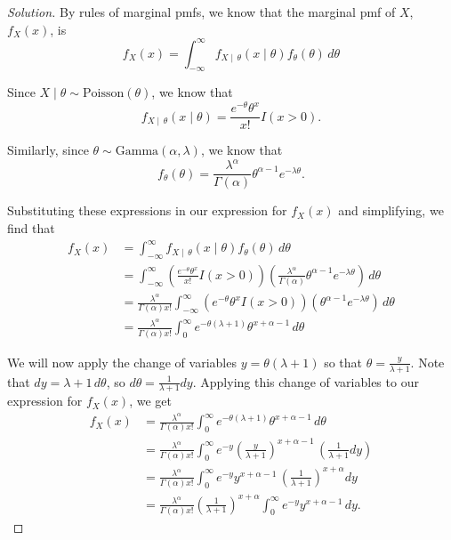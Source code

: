 \documentclass[11pt]{article}
\newenvironment{solution}
  {\renewcommand\qedsymbol{$\blacksquare$}\begin{proof}[Solution]}
  {\end{proof}}
\begin{document}
\begin{enumerate}
    \begin{solution}
    By rules of marginal pmfs, we know that the marginal pmf of $X$, $f_X(x)$, is
    \[
        f_X(x) = \int_{-\infty}^{\infty} f_{X \mid \,\theta}(x \mid \theta) f_\theta (\theta) \, d\theta
    \]

    Since $X \mid \theta \sim \mathrm{Poisson}(\theta)$, we know that 
    \[
        f_{X \mid \,\theta}(x \mid \theta) = \frac{e^{-\theta}\theta^x}{x!}I(x > 0).
    \]

    Similarly, since $\theta \sim \mathrm{Gamma}(\alpha, \lambda)$, we know that
    \[
        f_{\theta}(\theta) = \frac{\lambda^\alpha}{\Gamma(\alpha)}\theta^{\alpha - 1}e^{-\lambda\theta}.
    \]

    Substituting these expressions in our expression for $f_X(x)$ and simplifying, we find that
    \begin{align*}
        f_X(x) &= \int_{-\infty}^{\infty} f_{X \mid \,\theta}(x \mid \theta) f_\theta (\theta) \, d\theta \\
        &= \int_{-\infty}^{\infty} \left(\frac{e^{-\theta}\theta^x}{x!}I(x > 0)\right) \left( \frac{\lambda^\alpha}{\Gamma(\alpha)}\theta^{\alpha - 1}e^{-\lambda\theta} \right) \, d\theta \\
        &= \frac{\lambda^\alpha}{\Gamma(\alpha) x!} \int_{-\infty}^{\infty} \left(e^{-\theta}\theta^xI(x > 0)\right) \left( \theta^{\alpha - 1}e^{-\lambda\theta} \right) \, d\theta \\
        &= \frac{\lambda^\alpha}{\Gamma(\alpha) x!} \int_{0}^{\infty} e^{-\theta(\lambda + 1)}\theta^{x + \alpha - 1} \, d\theta 
    \end{align*}

    We will now apply the change of variables $y = \theta(\lambda + 1)$ so that $\theta = \frac{y}{\lambda + 1}$. Note that $dy = \lambda + 1 \, d\theta$, so $d\theta = \frac{1}{\lambda + 1} dy$. Applying this change of variables to our expression
    for $f_X(x)$, we get
    \begin{align*}
        f_X(x) &= \frac{\lambda^\alpha}{\Gamma(\alpha) x!} \int_{0}^{\infty} e^{-\theta(\lambda + 1)}\theta^{x + \alpha - 1} \, d\theta \\
        &= \frac{\lambda^\alpha}{\Gamma(\alpha) x!} \int_{0}^{\infty} e^{-y}\left( \frac{y}{\lambda + 1} \right) ^{x + \alpha - 1} \, \left( \frac{1}{\lambda + 1} dy \right)  \\
        &= \frac{\lambda^\alpha}{\Gamma(\alpha) x!} \int_{0}^{\infty} e^{-y}y^{x + \alpha - 1} \, \left( \frac{1}{\lambda + 1} \right)^{x + \alpha} dy \\
        &= \frac{\lambda^\alpha}{\Gamma(\alpha) x!} \left( \frac{1}{\lambda + 1} \right)^{x + \alpha} \int_{0}^{\infty} e^{-y}y^{x + \alpha - 1} \, dy.
    \end{align*}    


\end{solution}
\end{enumerate}
\end{document}
